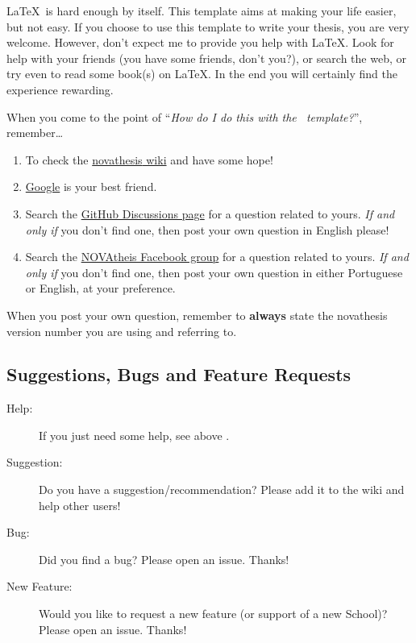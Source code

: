\LaTeX\ is hard enough by itself.  This template aims at making your life easier, but not easy. If you choose to use this template to write your thesis, you are very welcome.  However, don't expect me to provide you help with \LaTeX.  Look for help with your friends (you have some friends, don't you?), or search the web, or try even to read some book(s) on \LaTeX. In the end you will certainly find the experience rewarding.

When you come to the point of “\emph{How do I do this with the \novathesis\ template?}”, remember…

\begin{enumerate}
  \item To check the \href{https://github.com/joaomlourenco/novathesis/wiki}{\gls{novathesis} wiki} and have some hope!  \emojiSmile
  \item \href{https://www.google.com}{Google} is your best friend.
  \item Search the \href{https://github.com/joaomlourenco/novathesis/discussions}{GitHub Discussions page} for a question related to yours.  \emph{If and only if} you don't find one, then post your own question in English please!
  \item Search the \href{https://www.facebook.com/groups/novathesis}{NOVAtheis Facebook group} for a question related to yours.  \emph{If and only if} you don't find one, then post your own question in either Portuguese or English, at your preference.
\end{enumerate}

When you post your own question, remember to \textbf{always} state the \gls{novathesis} version number you are using and referring to.

\begin{center}
\end{center}


\subsection{Suggestions, Bugs and Feature Requests} %
\label{sub:suggestions_bugs_and_feature_requests}

\begin{description}
  \item[Help:] If you just need some help, see above .
  \item[Suggestion:] \ntindex[Suggestions]{} Do you have a suggestion/recommendation? Please add it to the wiki and help other users!
  \item[Bug:] \ntindex[Bugs]{} Did you find a bug? Please open an issue. Thanks!
  \item[New Feature:]  Would you like to request a new feature (or support of a new School)? Please open an issue. Thanks!

\end{description}



